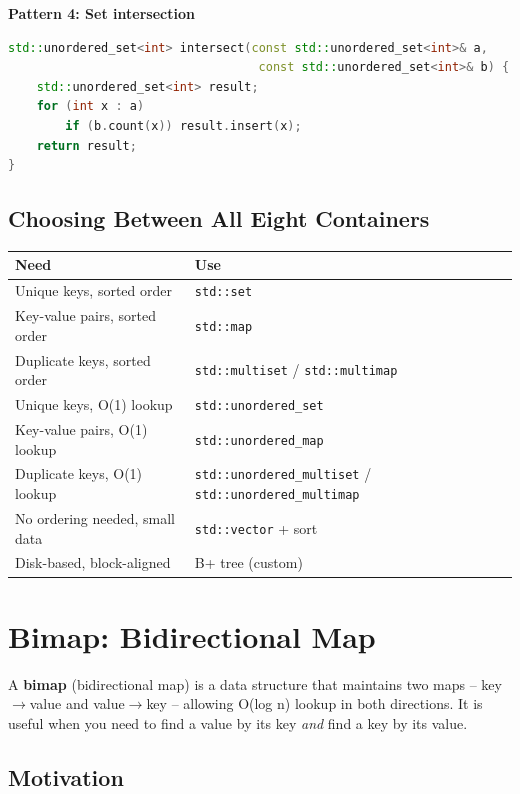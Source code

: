 \textbf{Pattern 4: Set intersection}
\begin{lstlisting}[language=C++]
std::unordered_set<int> intersect(const std::unordered_set<int>& a,
                                   const std::unordered_set<int>& b) {
    std::unordered_set<int> result;
    for (int x : a)
        if (b.count(x)) result.insert(x);
    return result;
}
\end{lstlisting}

\subsection{Choosing Between All Eight Containers}

\begin{center}
\begin{tabular}{ll}
\toprule
Need & Use \\
\midrule
Unique keys, sorted order & \texttt{std::set} \\
Key-value pairs, sorted order & \texttt{std::map} \\
Duplicate keys, sorted order & \texttt{std::multiset} / \texttt{std::multimap} \\
Unique keys, O(1) lookup & \texttt{std::unordered\_set} \\
Key-value pairs, O(1) lookup & \texttt{std::unordered\_map} \\
Duplicate keys, O(1) lookup & \texttt{std::unordered\_multiset} / \texttt{std::unordered\_multimap} \\
No ordering needed, small data & \texttt{std::vector} + sort \\
Disk-based, block-aligned & B+ tree (custom) \\
\bottomrule
\end{tabular}
\end{center}

\section{Bimap: Bidirectional Map}

\label{sec:bimap}

A \textbf{bimap} (bidirectional map) is a data structure that maintains two maps -- key$\to$value and value$\to$key -- allowing O(log n) lookup in both directions. It is useful when you need to find a value by its key \emph{and} find a key by its value.

\subsection{Motivation}

